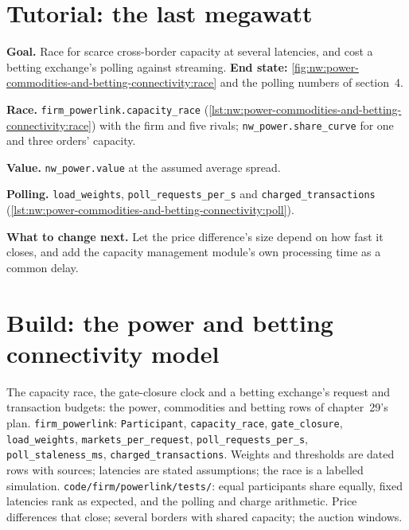 \section{Tutorial: the last megawatt}\label{tut:nw:power-commodities-and-betting-connectivity:tut}

\begin{tutorial}
\textbf{Goal.} Race for scarce cross-border capacity at several latencies, and cost a betting exchange's polling against streaming.
\textbf{End state:} \cref{fig:nw:power-commodities-and-betting-connectivity:race} and the polling numbers of section~4.
\begin{tutsteps}
\item \textbf{Race.} \texttt{firm\_powerlink.capacity\_race} (\cref{lst:nw:power-commodities-and-betting-connectivity:race}) with the
  firm and five rivals; \texttt{nw\_power.share\_curve} for one and three orders' capacity.
\item \textbf{Value.} \texttt{nw\_power.value} at the assumed average spread.
\item \textbf{Polling.} \texttt{load\_weights}, \texttt{poll\_requests\_per\_s} and \texttt{charged\_transactions}
  (\cref{lst:nw:power-commodities-and-betting-connectivity:poll}).
\end{tutsteps}
\textbf{What to change next.} Let the price difference's size depend on how fast it closes, and add the capacity management module's
own processing time as a common delay.
\end{tutorial}

\section{Build: the power and betting connectivity model}\label{bld:nw:power-commodities-and-betting-connectivity:powerlink}

\begin{build}
 The capacity race, the gate-closure clock and a betting exchange's request and transaction budgets: the power,
commodities and betting rows of chapter~29's plan.
 \texttt{firm\_powerlink}: \texttt{Participant}, \texttt{capacity\_race}, \texttt{gate\_closure},
\texttt{load\_weights}, \texttt{markets\_per\_request}, \texttt{poll\_requests\_per\_s}, \texttt{poll\_staleness\_ms},
\texttt{charged\_transactions}.
 Weights and thresholds are dated rows with sources; latencies are stated assumptions; the race is a labelled simulation.
 \texttt{code/firm/powerlink/tests/}: equal participants share equally, fixed latencies rank as expected, and
the polling and charge arithmetic.
 Price differences that close; several borders with shared capacity; the auction windows.
\end{build}

